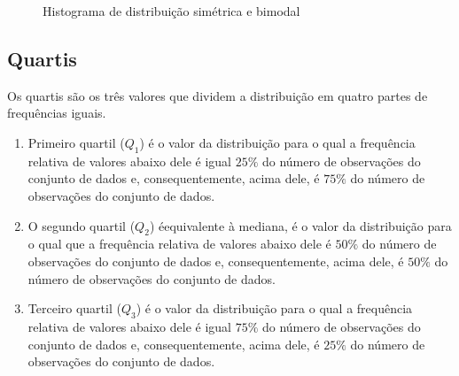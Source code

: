 \begin{figure}[H]
\centering
\capstart

\caption{Histograma de distribuição simétrica e bimodal}\label{\detokenize{PE104-1:id5}}\label{\detokenize{PE104-1:id20}}\end{figure}

\subsection{Quartis}

Os quartis são os três valores que dividem a distribuição em quatro partes de frequências iguais.

\begin{enumerate}
\item  Primeiro quartil (\(Q_1\)) é o valor da distribuição para o qual a frequência relativa de valores abaixo dele é igual $25\%$ do número de observações do conjunto de dados e, consequentemente, acima dele, é $75\%$ do número de observações do conjunto de dados.

\item O segundo quartil (\(Q_2\)) éequivalente à mediana, é o valor da distribuição para o qual que a frequência relativa de valores abaixo dele é  $50\%$ do número de observações do conjunto de dados e, consequentemente, acima dele, é $50\%$ do número de observações do conjunto de dados.

\item Terceiro quartil (\(Q_3\)) é o valor da distribuição para o qual a frequência relativa de valores abaixo dele é igual $75\%$ do número de observações do conjunto de dados e, consequentemente, acima dele, é $25\%$ do número de observações do conjunto de dados.
\end{enumerate}

